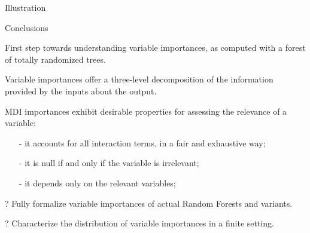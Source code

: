 \documentclass[final]{beamer}
\newcommand{\cmark}{\ding{51}}%
\begin{document}
\begin{frame}{}
\begin{textblock}{0.32}
\begin{block}{Illustration \phantom{p}}
\vspace{-0.5cm}

\end{block}

\begin{block}{Conclusions \phantom{p}}

{\color{green} \cmark} First step towards understanding variable importances, as computed with a forest of totally randomized trees.

{\color{green} \cmark} Variable importances offer a three-level decomposition of the information provided by the inputs about the output.

{\color{green} \cmark} MDI importances exhibit desirable properties for assessing the relevance of a variable:
\begin{itemize}
\item[-] it accounts for all interaction terms, in a fair and exhaustive way;
\item[-] it is null if and only if the variable is irrelevant;
\item[-] it depends only on the relevant variables;
\end{itemize}

{\color{blue} ?} Fully formalize variable importances of actual Random Forests and variants.

{\color{blue} ?} Characterize the distribution of variable importances in a finite setting.


\end{block}

\end{textblock}




\end{frame}
\end{document}
